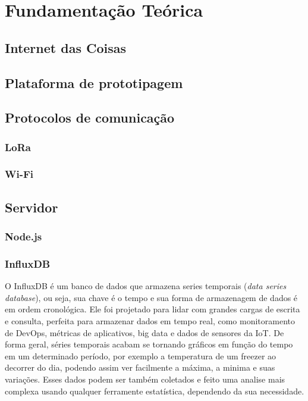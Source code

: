 \chapter{Fundamentação Teórica}
\label{cap:fundamentacao}

\section{Internet das Coisas}
\label{fund:iot}

\section{Plataforma de prototipagem}
\label{fund:plataforma-proto}

\section{Protocolos de comunicação}
\label{fund:protocolos}

\subsection{LoRa}
\label{fund:lora}
\subsection{Wi-Fi}
\label{fund:wifi}

\section{Servidor}
\label{fund:servidor}

\subsection{Node.js}
\label{fund:node}

\subsection{InfluxDB}
\label{fund:influxdb}
O InfluxDB é um banco de dados que armazena series temporais (\textit{data series database}), ou seja, sua chave é o tempo e sua forma de armazenagem de dados é em ordem cronológica. Ele foi projetado para lidar com grandes cargas de escrita e consulta, perfeita para armazenar dados em tempo real, como monitoramento de DevOps, métricas de aplicativos, big data e dados de sensores da IoT\cite{giacobbe2018implementation}. De forma geral, séries temporais acabam se tornando gráficos em função do tempo em um determinado período, por exemplo a temperatura de um freezer ao decorrer do dia, podendo assim ver facilmente a máxima, a minima e suas variações. Esses dados podem ser também coletados e feito uma analise mais complexa usando qualquer ferramente estatística, dependendo da sua necessidade.

